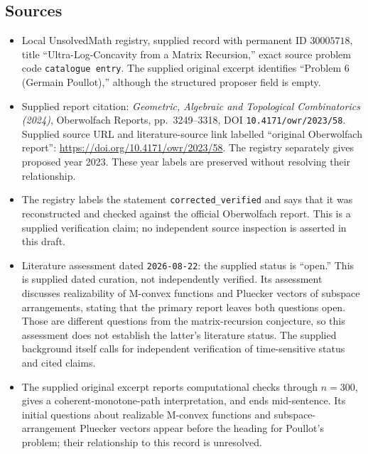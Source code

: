 \documentclass[11pt]{article}
\begin{document}
\subsection{Sources}
\begin{itemize}
\item Local UnsolvedMath registry, supplied record with permanent ID \(30005718\), title ``Ultra-Log-Concavity from a Matrix Recursion,'' exact source problem code \texttt{catalogue entry}. The supplied original excerpt identifies ``Problem 6 (Germain Poullot),'' although the structured proposer field is empty.
\item Supplied report citation: \emph{Geometric, Algebraic and Topological Combinatorics (2024)}, Oberwolfach Reports, pp.\ 3249--3318, DOI \texttt{10.4171/owr/2023/58}. Supplied source URL and literature-source link labelled ``original Oberwolfach report'': \url{https://doi.org/10.4171/owr/2023/58}. The registry separately gives proposed year 2023. These year labels are preserved without resolving their relationship.
\item The registry labels the statement \texttt{corrected\_verified} and says that it was reconstructed and checked against the official Oberwolfach report. This is a supplied verification claim; no independent source inspection is asserted in this draft.
\item Literature assessment dated \texttt{2026-08-22}: the supplied status is ``open.'' This is supplied dated curation, not independently verified. Its assessment discusses realizability of M-convex functions and Pluecker vectors of subspace arrangements, stating that the primary report leaves both questions open. Those are different questions from the matrix-recursion conjecture, so this assessment does not establish the latter's literature status. The supplied background itself calls for independent verification of time-sensitive status and cited claims.
\item The supplied original excerpt reports computational checks through \(n=300\), gives a coherent-monotone-path interpretation, and ends mid-sentence. Its initial questions about realizable M-convex functions and subspace-arrangement Pluecker vectors appear before the heading for Poullot's problem; their relationship to this record is unresolved.
\end{itemize}
\end{document}
